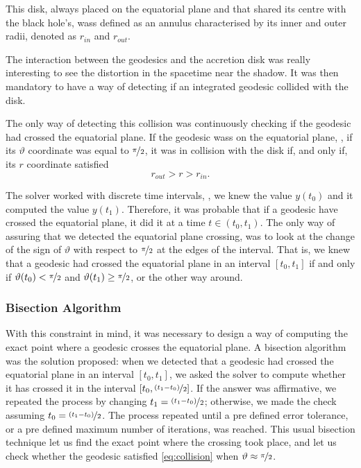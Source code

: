 This disk, always placed on the equatorial plane and that shared its centre with the black hole's, wass defined as an annulus characterised by its inner and outer radii, denoted as $r_{in}$ and $r_{out}$.

The interaction between the geodesics and the accretion disk was really interesting to see the distortion in the spacetime near the shadow. It was then mandatory to have a way of detecting if an integrated geodesic collided with the disk.

The only way of detecting this collision was continuously checking if the geodesic had crossed the equatorial plane. If the geodesic wass on the equatorial plane, \ie, if its $\vartheta$ coordinate was equal to $\nicefrac{\pi}{2}$, it was in collision with the disk if, and only if, its $r$ coordinate satisfied
\begin{equation}
\label{eq:collision}
r_{out} > r > r_{in}.
\end{equation}

The solver worked with discrete time intervals, \ie, we knew the value $y(t_0)$ and it computed the value $y(t_1)$. Therefore, it was probable that if a geodesic have crossed the equatorial plane, it did it at a time $t \in (t_0, t_1)$. The only way of assuring that we detected the equatorial plane crossing, was to look at the change of the sign of $\vartheta$ with respect to $\nicefrac{\pi}{2}$ at the edges of the interval. That is, we knew that a geodesic had crossed the equatorial plane in an interval $[t_0, t_1]$ if and only if $\vartheta(t_0) < \nicefrac{\pi}{2}$ and $\vartheta(t_1) \geq \nicefrac{\pi}{2}$, or the other way around.

\subsubsection*{Bisection Algorithm}

With this constraint in mind, it was necessary to design a way of computing the exact point where a geodesic crosses the equatorial plane. A bisection algorithm was the solution proposed: when we detected that a geodesic had crossed the equatorial plane in an interval $[t_0, t_1]$, we asked the solver to compute whether it has crossed it in the interval $[t_0, \nicefrac{(t_1 - t_0)}{2}]$. If the answer was affirmative, we repeated the process by changing $t_1 = \nicefrac{(t_1 - t_0)}{2}$; otherwise, we made the check assuming $t_0 = \nicefrac{(t_1 - t_0)}{2}$. The process repeated until a pre defined error tolerance, or a pre defined maximum number of iterations, was reached. This usual bisection technique let us find the exact point where the crossing took place, and let us check whether the geodesic satisfied \autoref{eq:collision} when $\vartheta \approx \nicefrac{\pi}{2}$.

